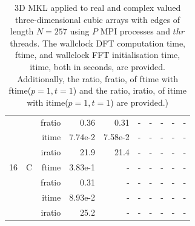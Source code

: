 \documentclass[a4paper]{article}
\begin{document}
\begin{table}[htbp]
\begin{center}
\begin{small}
\begin{tabular}{|r|r|r|r|r|r|r|r|r|r|}
             &             &  fratio &    0.36 &   0.31 &      - &      - &      - &      - &      - \\
             &             &  itime &    7.74e-2 &    7.58e-2 &      - &      - &      - &      - &      - \\
             &             &  iratio &    21.9 &   21.4 &     - &      - &      - &      - &      - \\\hline
   16 &   C &  ftime &    3.83e-1 &      - &      - &      - &      - &      - &      - \\
             &             &  fratio &   0.31 &      - &      - &      - &      - &      - &      - \\
             &             &  itime &    8.93e-2 &      - &      - &      - &      - &      - &      - \\
             &             &  iratio &    25.2 &     - &      - &      - &      - &      - &      - \\\hline
\end{tabular}
\caption{3D MKL applied to real and complex valued three-dimensional cubic arrays with edges of length $N=257$ using $P$ MPI processes and $thr$ threads. The wallclock DFT computation time, ftime, and wallclock FFT initialisation time, itime, both in seconds, are provided. Additionally, the ratio, fratio, of ftime  with ftime($p=1,t=1$) and the ratio, iratio, of itime  with itime($p=1,t=1$) are provided.) }\label{Tbl:MKL3d257}
\end{small}
\end{center}
\end{table}
\end{document}
